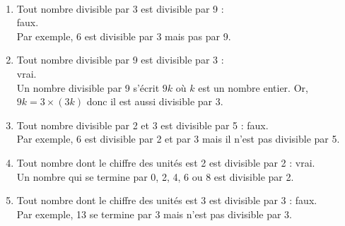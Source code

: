 \begin{colonne*exercice}
\begin{corrige}
   \ \\ [-5mm]
   \begin{enumerate}
      \item Tout nombre divisible par 3 est divisible par 9 : \\
         {\blue faux}. \\
         Par exemple, 6 est divisible par 3 mais pas par 9.
      \item Tout nombre divisible par 9 est divisible par 3 : \\
         {\blue vrai}. \\
         Un nombre divisible par 9 s'écrit $9k$ où $k$ est un nombre entier. Or, $9k =3\times(3k)$ donc il est aussi divisible par 3.
      \item Tout nombre divisible par 2 et 3 est divisible par 5 : {\blue faux}. \\
      Par exemple, 6 est divisible par 2 et par 3 mais il n'est pas divisible par 5.
      \item Tout nombre dont le chiffre des unités est 2 est divisible par 2 : {\blue vrai}. \\
      Un nombre qui se termine par 0, 2, 4, 6 ou 8 est divisible par 2.
      \item Tout nombre dont le chiffre des unités est 3 est divisible par 3 : {\blue faux}. \\
      Par exemple, 13 se termine par 3 mais n'est pas divisible par 3.
   \end{enumerate}
   
\Coupe
{}
\medskip


\end{corrige}
\end{colonne*exercice}
